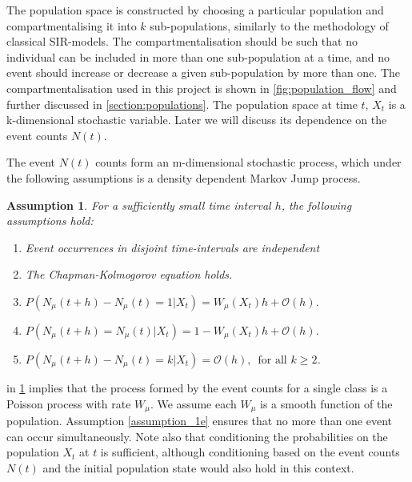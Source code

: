 \documentclass[10pt,a4paper]{article}
\newtheorem{assumption}{Assumption}
\begin{document}
The population space is constructed by choosing a particular population and compartmentalising it into $k$ sub-populations, similarly to the methodology of classical SIR-models. The compartmentalisation should be such that no individual can be included in more than one sub-population at a time, and no event should increase or decrease a given sub-population by more than one. The compartmentalisation used in this project is shown in \cref{fig:population_flow} and further discussed in \cref{section:populations}. The population space at time $t$, $X_t$ is a k-dimensional stochastic variable. Later we will discuss its dependence on the event counts $N \left( t \right)$.

The event $N\left( t \right)$ counts form an m-dimensional stochastic process, which under the following assumptions is a density dependent Markov Jump process.

\begin{assumption} For a sufficiently small time interval $h$, the following assumptions hold:
	\begin{enumerate}
		\item Event occurrences in disjoint time-intervals are independent \label{assumption_1a}

		\item The Chapman-Kolmogorov equation \cite{Kolmogoroff1931,Feller1940} holds.  \label{assumption_1b}

		\item $P\left( N_{\mu} \left( t  + h \right)  - N_{\mu} \left( t \right) = 1 | X_t \right) = W_{\mu} \left( X_t \right) h + \mathcal{O} \left( h \right)$. \label{assumption_1c}
	
		\item $P\left( N_{\mu}\left( t+h\right) = N_{\mu} \left( t \right) | X_t \right) = 1-W_{\mu}\left( X_t \right) h + \mathcal{O}\left( h \right)$. \label{assumption_1d}

		\item $P\left( N_{\mu}\left( t + h \right ) - N_{\mu} \left( t \right) = k | X_t \right)= \mathcal{O}\left( h \right) , \, \textrm{ for all } k \geq 2$. \label{assumption_1e}
	\end{enumerate} \label{assumption_1}
\end{assumption}

 in \cref{assumption_1} implies that the process formed by the event counts for a single class is a Poisson process with rate $W_{\mu}$. We assume each $W_{\mu}$ is a smooth function of the population. Assumption \ref{assumption_1e} ensures that no more than one event can occur simultaneously. Note also that conditioning the probabilities on the population $X_t$ at $t$ is sufficient, although conditioning based on the event counts $N\left( t \right)$ and the initial population state would also hold in this context.
\end{document}
